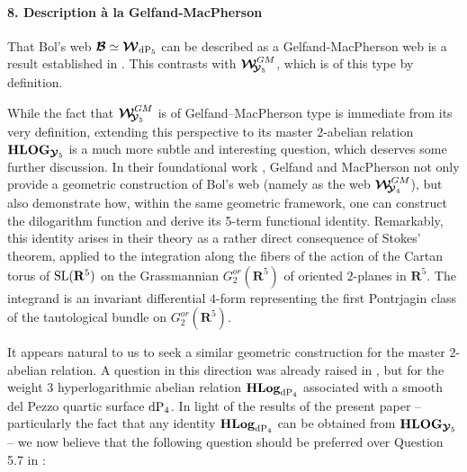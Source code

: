 \documentclass[11pt]{amsart}
\begin{document}
\paragraph{\bf 8. Description \`a la Gelfand-MacPherson}
That Bol's web $\boldsymbol{\mathcal B}\simeq \boldsymbol{\mathcal W}_{ {\rm dP}_5}$ can be described as a Gelfand-MacPherson web is a result established in \cite{GM}. This contrasts with  $\boldsymbol{\mathcal W}_{\hspace{-0.1cm} \boldsymbol{\mathcal Y}_5}^{GM}$, which is of this type by definition.



While the fact that $\boldsymbol{\mathcal W}_{\hspace{-0.1cm} \boldsymbol{\mathcal Y}_5}^{GM}$ is of Gelfand--MacPherson type is immediate from its very definition, extending this perspective to its master 2-abelian relation ${\bf HLOG}_{\boldsymbol{\mathcal Y}_5}$ is a much more subtle and interesting question, which deserves some further discussion. In their foundational work \cite{GM}, Gelfand and MacPherson not only provide a geometric construction of Bol's web (namely as the web  $\boldsymbol{\mathcal W}_{\hspace{-0.1cm} \boldsymbol{\mathcal Y}_4}^{GM}$), but also demonstrate how, within the same geometric framework, one can construct the dilogarithm function and derive its 5-term functional identity. 
Remarkably, this identity arises in their theory as a rather direct consequence of Stokes' theorem, applied to the integration along the fibers of the action of the Cartan torus of ${\rm SL}(\mathbf{R}^5)$ on the Grassmannian $G_2^{or}(\mathbf R^5)$ of oriented $2$-planes in $\mathbf{R}^5$. The integrand is an invariant differential $4$-form representing the first Pontrjagin class of the tautological bundle on $G_2^{or}(\mathbf R^5)$.





It appears natural to us to seek a similar geometric construction for the master 2-abelian relation. A question in this direction was already raised in \cite[\S5.9]{PirioAFST}, but for the weight 3 hyperlogarithmic abelian relation 
${\bf HLog}_{ {\rm dP}_4}$ associated with a smooth del Pezzo quartic surface  ${\rm dP}_4$.  In light of the results of the present paper -- particularly the fact that any identity ${\bf HLog}_{ {\rm dP}_4}$ can be obtained from 
${\bf HLOG}_{\boldsymbol{\mathcal Y}_5}$ -- we now believe that the following question should be preferred over Question 5.7 in \cite{PirioAFST}: 
\end{document}
